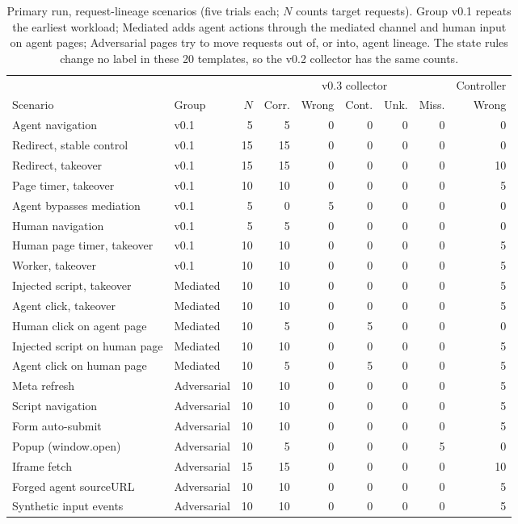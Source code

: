 \begin{table}[tb]
\centering\footnotesize
\setlength{\tabcolsep}{4pt}
\begin{tabularx}{\linewidth}{@{}Xlrrrrrrr@{}}
\toprule
& & & \multicolumn{5}{c}{v0.3 collector} & Controller \\
\cmidrule(lr){4-8}\cmidrule(l){9-9}
Scenario & Group & $N$ & Corr. & Wrong & Cont. & Unk. & Miss. & Wrong \\
\midrule
Agent navigation & v0.1 & 5 & 5 & 0 & 0 & 0 & 0 & 0 \\
Redirect, stable control & v0.1 & 15 & 15 & 0 & 0 & 0 & 0 & 0 \\
Redirect, takeover & v0.1 & 15 & 15 & 0 & 0 & 0 & 0 & 10 \\
Page timer, takeover & v0.1 & 10 & 10 & 0 & 0 & 0 & 0 & 5 \\
Agent bypasses mediation & v0.1 & 5 & 0 & 5 & 0 & 0 & 0 & 0 \\
Human navigation & v0.1 & 5 & 5 & 0 & 0 & 0 & 0 & 0 \\
Human page timer, takeover & v0.1 & 10 & 10 & 0 & 0 & 0 & 0 & 5 \\
Worker, takeover & v0.1 & 10 & 10 & 0 & 0 & 0 & 0 & 5 \\
Injected script, takeover & Mediated & 10 & 10 & 0 & 0 & 0 & 0 & 5 \\
Agent click, takeover & Mediated & 10 & 10 & 0 & 0 & 0 & 0 & 5 \\
Human click on agent page & Mediated & 10 & 5 & 0 & 5 & 0 & 0 & 0 \\
Injected script on human page & Mediated & 10 & 10 & 0 & 0 & 0 & 0 & 5 \\
Agent click on human page & Mediated & 10 & 5 & 0 & 5 & 0 & 0 & 5 \\
Meta refresh & Adversarial & 10 & 10 & 0 & 0 & 0 & 0 & 5 \\
Script navigation & Adversarial & 10 & 10 & 0 & 0 & 0 & 0 & 5 \\
Form auto-submit & Adversarial & 10 & 10 & 0 & 0 & 0 & 0 & 5 \\
Popup (window.open) & Adversarial & 10 & 5 & 0 & 0 & 0 & 5 & 0 \\
Iframe fetch & Adversarial & 15 & 15 & 0 & 0 & 0 & 0 & 10 \\
Forged agent sourceURL & Adversarial & 10 & 10 & 0 & 0 & 0 & 0 & 5 \\
Synthetic input events & Adversarial & 10 & 10 & 0 & 0 & 0 & 0 & 5 \\
\bottomrule
\end{tabularx}
\caption{Primary run, request-lineage scenarios (five trials each; $N$ counts target requests). Group v0.1 repeats the earliest workload; Mediated adds agent actions through the mediated channel and human input on agent pages; Adversarial pages try to move requests out of, or into, agent lineage. The state rules change no label in these 20 templates, so the v0.2 collector has the same counts.}
\label{tab:scenarios}
\end{table}
